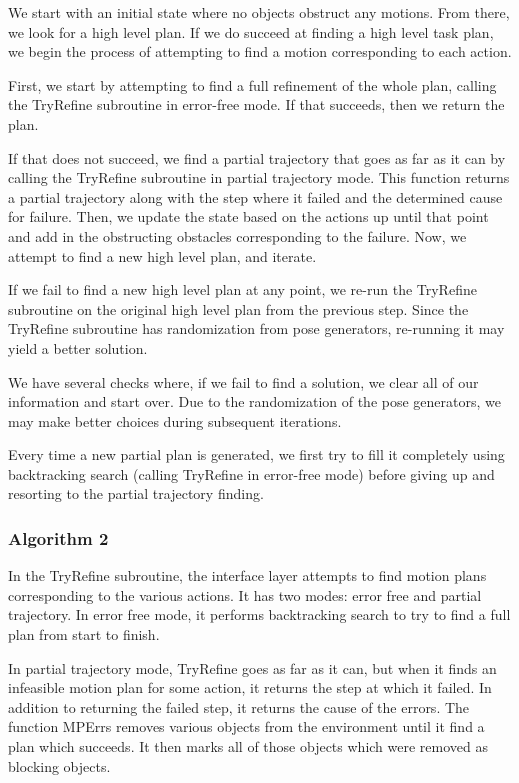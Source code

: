 \documentclass[12pt]{article}
\begin{document}
We start with an initial state where no objects obstruct any motions.  
From there, we look for a high level plan.  
If we do succeed at finding a high level task plan, we begin the process of attempting to find a motion corresponding to each action.

First, we start by attempting to find a full refinement of the whole plan, calling the TryRefine subroutine in error-free mode.  
If that succeeds, then we return the plan.  

If that does not succeed, we find a partial trajectory that goes as far as it can by calling the TryRefine subroutine in partial trajectory mode.  
This function returns a partial trajectory along with the step where it failed and the determined cause for failure.  
Then, we update the state based on the actions up until that point and add in the obstructing obstacles corresponding to the failure.  
Now, we attempt to find a new high level plan, and iterate.  

If we fail to find a new high level plan at any point, we re-run the TryRefine subroutine on the original high level plan from the previous step.  
Since the TryRefine subroutine has randomization from pose generators, re-running it may yield a better solution. 

We have several checks where, if we fail to find a solution, we clear all of our information and start over.  
Due to the randomization of the pose generators, we may make better choices during subsequent iterations.  

Every time a new partial plan is generated, we first try to fill it completely using backtracking search (calling TryRefine in error-free mode) before giving up and resorting to the partial trajectory finding.  

\subsubsection{Algorithm 2}


In the TryRefine subroutine, the interface layer attempts to find motion plans corresponding to the various actions.  
It has two modes: error free and partial trajectory.  
In error free mode, it performs backtracking search to try to find a full plan from start to finish.  

In partial trajectory mode, TryRefine goes as far as it can, but when it finds an infeasible motion plan for some action, it returns the step at which it failed.  
In addition to returning the failed step, it returns the cause of the errors.  
The function MPErrs removes various objects from the environment until it find a plan which succeeds.  
It then marks all of those objects which were removed as blocking objects.
\end{document}
